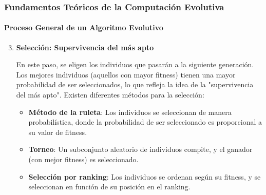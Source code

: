 \documentclass[
	11pt, %
]{beamer}
\begin{document}
\begin{frame}
    \frametitle{Fundamentos Teóricos de la Computación Evolutiva}
    \framesubtitle{Proceso General de un Algoritmo Evolutivo}
    \begin{enumerate}
    \setcounter{enumi}{2}
        \item \textbf{Selección: Supervivencia del más apto}
        
        En este paso, se eligen los individuos que pasarán a la siguiente generación. Los mejores individuos (aquellos con mayor fitness) tienen una mayor probabilidad de ser seleccionados, lo que refleja la idea de la "supervivencia del más apto". Existen diferentes métodos para la selección:
        
        \begin{itemize}
            \item \textbf{Método de la ruleta}: Los individuos se seleccionan de manera probabilística, donde la probabilidad de ser seleccionado es proporcional a su valor de fitness.
            \item \textbf{Torneo}: Un subconjunto aleatorio de individuos compite, y el ganador (con mejor fitness) es seleccionado.
            \item \textbf{Selección por ranking}: Los individuos se ordenan según su fitness, y se seleccionan en función de su posición en el ranking.
        \end{itemize}
    \end{enumerate}
\end{frame}
\end{document}
